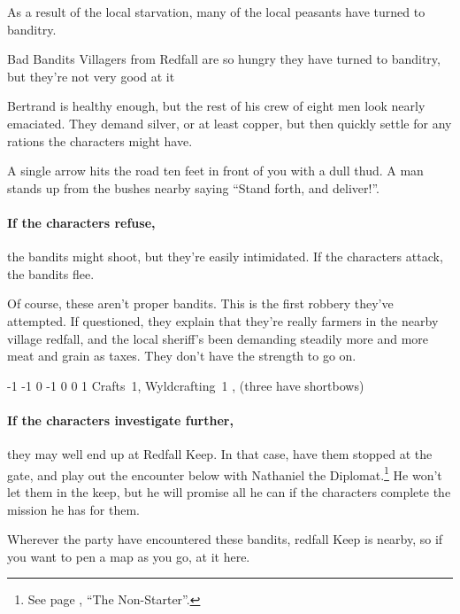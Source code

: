 \begin{multicols}{2}
As a result of the local starvation, many of the local peasants have turned to banditry.

{\N Bad Bandits}%
{Villagers from Redfall are so hungry they have turned to banditry, but they're not very good at it}%

Bertrand is healthy enough, but the rest of his crew of eight men look nearly emaciated.
They demand silver, or at least copper, but then quickly settle for any rations the characters might have.

\begin{boxtext}

	A single arrow hits the road ten feet in front of you with a dull thud.
	A man stands up from the bushes nearby saying ``Stand forth, and deliver!''.

\end{boxtext}

\paragraph{If the characters refuse,}
the bandits might shoot, but they're easily intimidated.  If the characters attack, the bandits flee.

Of course, these aren't proper bandits.
This is the first robbery they've attempted.
If questioned, they explain that they're really farmers in the nearby village \gls{redfall}, and the local sheriff's been demanding steadily more and more meat and grain as taxes.
They don't have the strength to go on.


	{-1}%
	{-1}%
	{{0}%
	{-1}%
	{0}}%
	{0}%
	{1}%
	{Crafts~1, Wyldcrafting~1}%
	{\Dagger, (three have shortbows)}%
	{}

\paragraph{If the characters investigate further,}
they may well end up at Redfall Keep.
In that case, have them stopped at the gate, and play out the encounter below with Nathaniel the Diplomat.\footnote{See page \pageref{nonstarter}, ``The Non-Starter''.}
He won't let them in the keep, but he will promise all he can if the characters complete the mission he has for them.

Wherever the party have encountered these bandits, \gls{redfall} Keep is nearby, so if you want to pen a map as you go, at it here.


\end{multicols}
